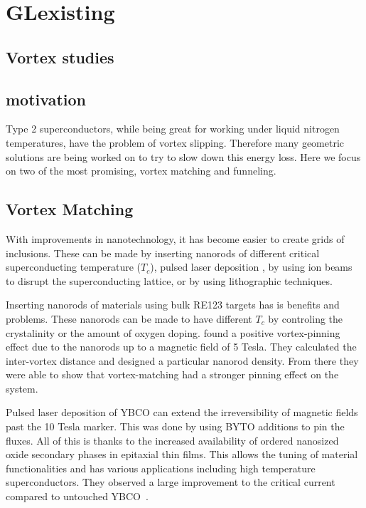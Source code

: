 \chapter{GLexisting}          %
\label{codechap}
\section{Vortex studies}

\section{motivation}
Type 2 superconductors, while being great for working under liquid nitrogen temperatures, have the problem of vortex slipping. Therefore many geometric solutions are being worked on to try to slow down this energy loss. Here we focus on two of the most promising, vortex matching and funneling. 

\section{Vortex Matching}
With improvements in nanotechnology, it has become easier to create grids of inclusions. These can be made by inserting nanorods of different critical superconducting temperature ($T_c$), pulsed laser deposition , by using ion beams to disrupt the superconducting lattice, or by using lithographic techniques.

Inserting nanorods of materials using bulk RE123 targets has is benefits and problems. These nanorods can be made to have different $T_c$ by controling the crystalinity or the amount of oxygen doping. \cite{Horii15} found a positive vortex-pinning effect due to the nanorods up to a magnetic field of 5 Tesla. They calculated the inter-vortex distance and designed a particular nanorod density. From there they were able to show that vortex-matching had a stronger pinning effect on the system.

Pulsed laser deposition of YBCO can extend the irreversibility of magnetic fields past the 10 Tesla marker. This was done by using BYTO additions to pin the fluxes. All of this is thanks to the increased availability of ordered nanosized oxide secondary phases in epitaxial thin films. This allows the tuning of material functionalities and has various applications including high temperature superconductors. They observed a large improvement to the critical current compared to untouched YBCO~\cite{Rizzo16}.

